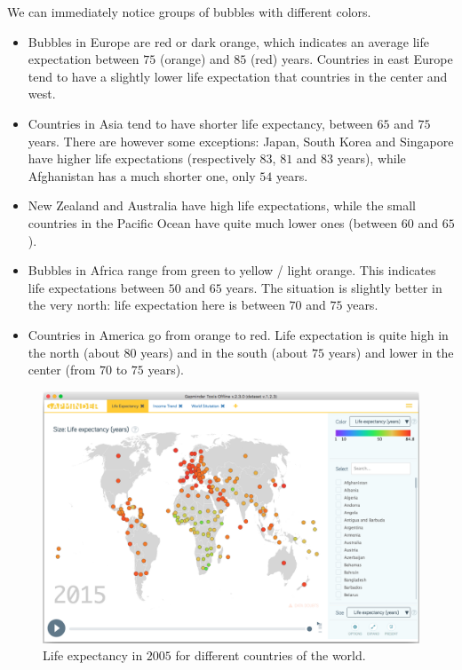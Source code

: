 We can immediately notice groups of bubbles with different colors.
\begin{itemize}
	\item Bubbles in Europe are red or dark orange, which indicates an average life expectation between $75$ (orange) and $85$ (red) years.	Countries in east Europe tend to have a slightly lower life expectation that countries in the center and west.
	\item Countries in Asia tend to have shorter life expectancy, between $65$ and $75$ years. There are however some exceptions: Japan, South Korea and Singapore have higher life expectations (respectively $83$, $81$ and $83$ years), while Afghanistan has a much shorter one, only $54$ years.
	\item New Zealand and Australia have high life expectations, while the small countries in the Pacific Ocean have quite much lower ones (between $60$ and $65$).
	\item Bubbles in Africa range from green to yellow / light orange. This indicates life expectations between $50$ and $65$ years. The situation is slightly better in the very north: life expectation here is between $70$ and $75$ years.
	\item Countries in America go from orange to red. Life expectation is quite high in the north (about $80$ years) and in the south (about $75$ years) and lower in the center (from $70$ to $75$ years).
\end{itemize}

\begin{figure}[h]
	\centering
	\includegraphics[width=0.95\columnwidth]{figures/life-expectancy}
	\caption{Life expectancy in $2005$ for different countries of the world.}
	\label{fig:life-expectation}
\end{figure}

